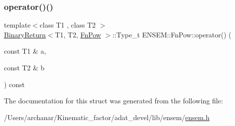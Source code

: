 \mbox{\label{structENSEM_1_1FnPow_ad7f15cdc82e84e8bd8e07a4bc8dcb633}} 
\subsubsection{\texorpdfstring{operator()()}{operator()()}\hspace{0.1cm}{\footnotesize\ttfamily [2/2]}}
{\footnotesize\ttfamily template$<$class T1 , class T2 $>$ \\
\mbox{\hyperlink{structENSEM_1_1BinaryReturn}{Binary\+Return}}$<$T1, T2, \mbox{\hyperlink{structENSEM_1_1FnPow}{Fn\+Pow}} $>$\+::Type\+\_\+t E\+N\+S\+E\+M\+::\+Fn\+Pow\+::operator() (\begin{DoxyParamCaption}\item[{const T1 \&}]{a,  }\item[{const T2 \&}]{b }\end{DoxyParamCaption}) const\hspace{0.3cm}{\ttfamily [inline]}}



The documentation for this struct was generated from the following file\+:\begin{DoxyCompactItemize}
\item 
/\+Users/archanar/\+Kinematic\+\_\+factor/adat\+\_\+devel/lib/ensem/\mbox{\hyperlink{lib_2ensem_2ensem_8h}{ensem.\+h}}\end{DoxyCompactItemize}
